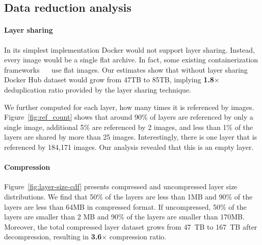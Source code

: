 \subsection{Data reduction analysis} 
\label{sec:dedup_ratio}

\paragraph{Layer sharing}

In its simplest implementation Docker would not support layer sharing.
%
Instead, every image would be a single flat archive.
%
In fact, some existing containerization frameworks
~\cite{singularity}~\cite{openvz} 
%
%
%
%
use flat images.
%
Our estimates show that without layer sharing Docker Hub dataset would grow
from 47TB to 85TB, implying \textbf{1.8$\times$} deduplication ratio provided
by the layer sharing technique.
 
We further computed for each layer, how many times it is referenced by images.
%
Figure~\ref{fig:ref_count} shows that around 90\% of layers are referenced by
only a single image, additional 5\% are referenced by 2 images, and less than
1\% of the layers are shared by more than 25 images.
%
Interestingly, there is one layer that is referenced by 184,171 images.  Our
analysis revealed that this is an empty layer.
%
%
%




\paragraph{Compression}
%
Figure~\ref{fig:layer-size-cdf} presents compressed and uncompressed layer size
distributions.
%
We find that 50\% of the layers are less than 1MB and 90\% of the layers are
less than 64MB in compressed format.
%
If uncompressed, 50\% of the layers are smaller than 2 MB and 90\% of the
layers are smaller than 170MB.
%
Moreover, the total compressed layer dataset grows from 47~TB to 167~TB after decompression, resulting in \textbf{3.6$\times$} compression ratio.

